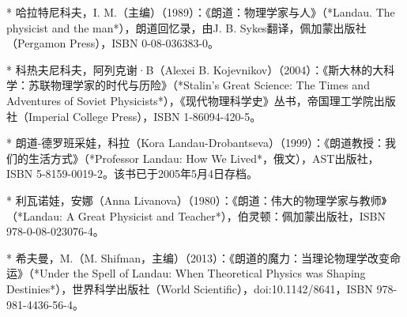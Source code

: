 * 哈拉特尼科夫，I. M.（主编）（1989）：《朗道：物理学家与人》（*Landau. The physicist and the man*），朗道回忆录，由J. B. Sykes翻译，佩加蒙出版社（Pergamon Press），ISBN 0-08-036383-0。

* 科热夫尼科夫，阿列克谢·B（Alexei B. Kojevnikov）（2004）：《斯大林的大科学：苏联物理学家的时代与历险》（*Stalin's Great Science: The Times and Adventures of Soviet Physicists*），《现代物理科学史》丛书，帝国理工学院出版社（Imperial College Press），ISBN 1-86094-420-5。

* 朗道-德罗班采娃，科拉（Kora Landau-Drobantseva）（1999）：《朗道教授：我们的生活方式》（*Professor Landau: How We Lived*，俄文），AST出版社，ISBN 5-8159-0019-2。该书已于2005年5月4日存档。

* 利瓦诺娃，安娜（Anna Livanova）（1980）：《朗道：伟大的物理学家与教师》（*Landau: A Great Physicist and Teacher*），伯灵顿：佩加蒙出版社，ISBN 978-0-08-023076-4。

* 希夫曼，M.（M. Shifman，主编）（2013）：《朗道的魔力：当理论物理学改变命运》（*Under the Spell of Landau: When Theoretical Physics was Shaping Destinies*），世界科学出版社（World Scientific），doi:10.1142/8641，ISBN 978-981-4436-56-4。

